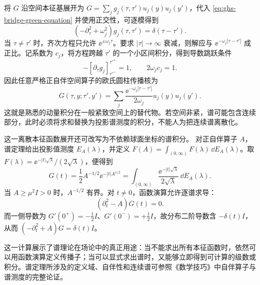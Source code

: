 将 $G$ 沿空间本征基展开为 $G=\sum_jg_j(\tau,\tau')u_j(y)u_j(y')$，代入 \cref{eq:ghs-bridge-green-equation} 并使用正交性，可逐模得到
\[
 (-\partial_\tau^2+\omega_j^2)g_j(\tau,\tau')=\delta(\tau-\tau').
\]
当 $\tau\ne\tau'$ 时，齐次方程只允许 $\ee^{\pm\omega_j\tau}$。要求 $|\tau|\to\infty$ 衰减，则解应与 $\ee^{-\omega_j|\tau-\tau'|}$ 成正比。记系数为 $c_j$，将方程跨越 $\tau'$ 的一个小区间积分，得到导数跳跃条件
\[
 -\left[\partial_\tau g_j\right]_{\tau'^-}^{\tau'^+}=1,
 \qquad 2\omega_jc_j=1.
\]
因此任意严格正自伴空间算子的欧氏圆柱传播核为
\begin{equation}\label{eq:ghs-bridge-spectral-G}
 G(\tau,y;\tau',y')
 =\sum_j\frac{\ee^{-\omega_j|\tau-\tau'|}}{2\omega_j}
 u_j(y)u_j(y').
\end{equation}
这就是熟悉的动量积分在一般紧致空间上的替代物。若空间非紧，谱可能包含连续部分，此时必须将求和替换为投影谱测度的积分，不能人为把连续谱离散化。


这一离散本征函数展开还可改写为不依赖球面坐标的谱积分。
对正自伴算子 $A$，谱定理给出投影值测度 $E_A(\lambda)$，并定义 $F(A)=\int_{(0,\infty)}F(\lambda)\,\dd E_A(\lambda)$。取 $F(\lambda)=\ee^{-|t|\sqrt\lambda}/(2\sqrt\lambda)$，便得到
\[
 G(t)=\frac12A^{-1/2}\ee^{-|t|A^{1/2}}
 =\int_{(0,\infty)}\frac{\ee^{-|t|\sqrt\lambda}}{2\sqrt\lambda}\,\dd E_A(\lambda).
\]
当 $A\ge\mu^2I>0$ 时，$A^{-1/2}$ 有界。对 $t\ne0$，函数演算允许逐谱求导：
\[
 (\partial_t^2-A)G(t)=0.
\]
而一侧导数为 $G'(0^+)=-\frac12I$、$G'(0^-)={+}\frac12I$，故分布二阶导数含 $-\delta(t)I$，从而 $(-\partial_t^2+A)G=\delta(t)I$。


这一计算展示了谱理论在场论中的真正用途：当不能求出所有本征函数时，依然可以用函数演算定义传播子；当可以显式求出谱时，又能够立即得到可计算的级数或积分。谱定理所涉及的定义域、自伴性和连续谱可参照《数学技巧》中自伴算子与谱测度的完整论证。


